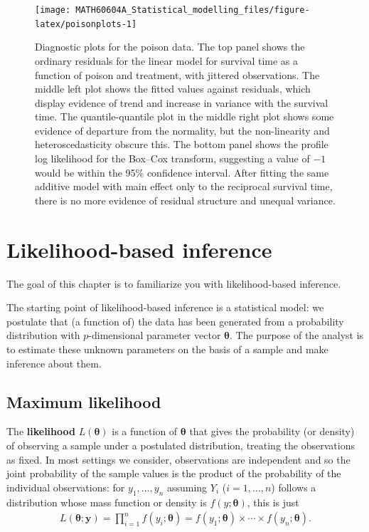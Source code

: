 \documentclass[
  11pt,
  letterpaper,
]{book}
\theoremstyle{definition}
\theoremstyle{definition}
\theoremstyle{definition}
\theoremstyle{definition}
\theoremstyle{remark}
\begin{document}
\begin{figure}

{\centering \texttt{[image: MATH60604A\_Statistical\_modelling\_files/figure-latex/poisonplots-1]} 

}

\caption{Diagnostic plots for the poison data. The top panel shows the ordinary residuals for the linear model for survival time as a function of poison and treatment, with jittered observations. The middle left plot shows the fitted values against residuals, which display evidence of trend and increase in variance with the survival time. The quantile-quantile plot in the middle right plot shows some evidence of departure from the normality, but the non-linearity and heteroscedasticity obscure this. The bottom panel shows the profile log likelihood for the Box--Cox transform, suggesting a value of $-1$ would be within the 95\% confidence interval. After fitting the same additive model with main effect only to the reciprocal survival time, there is no more evidence of residual structure and unequal variance.}\label{fig:poisonplots}
\end{figure}

\hypertarget{likelihood}{%
\chapter{Likelihood-based inference}\label{likelihood}}

The goal of this chapter is to familiarize you with likelihood-based inference.

The starting point of likelihood-based inference is a statistical model: we postulate that (a function of) the data has been generated from a probability distribution with \(p\)-dimensional parameter vector \(\boldsymbol{\theta}\). The purpose of the analyst is to estimate these unknown parameters on the basis of a sample and make inference about them.

\hypertarget{maximum-likelihood}{%
\section{Maximum likelihood}\label{maximum-likelihood}}

The \textbf{likelihood} \(L(\boldsymbol{\theta})\) is a function of \(\boldsymbol{\theta}\) that gives the probability (or density) of observing a sample under a postulated distribution, treating the observations as fixed. In most settings we consider, observations are independent and so the joint probability of the sample values is the product of the probability of the individual observations: for \(y_1, \ldots, y_n\) assuming \(Y_i\) (\(i=1, \ldots, n\)) follows a distribution whose mass function or density is \(f(y; \boldsymbol{\theta})\), this is just
\begin{align*}
L(\boldsymbol{\theta}; \boldsymbol{y}) = \prod_{i=1}^n f(y_i; \boldsymbol{\theta}) = f(y_1; \boldsymbol{\theta}) \times \cdots \times f(y_n; \boldsymbol{\theta}).
\end{align*}
\end{document}
